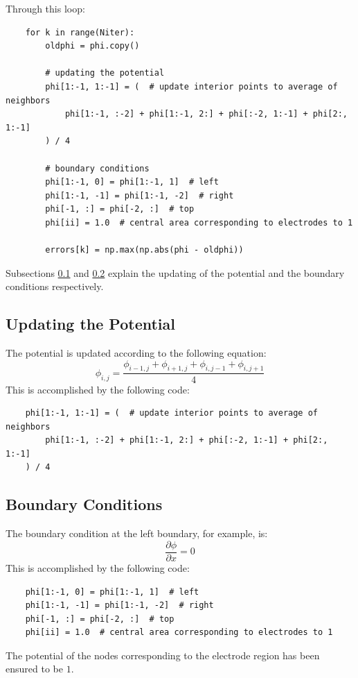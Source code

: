 \documentclass[12pt, a4paper]{article}
\begin{document}
Through this loop:
\begin{lstlisting}
    for k in range(Niter):
        oldphi = phi.copy()

        # updating the potential
        phi[1:-1, 1:-1] = (  # update interior points to average of neighbors
            phi[1:-1, :-2] + phi[1:-1, 2:] + phi[:-2, 1:-1] + phi[2:, 1:-1]
        ) / 4

        # boundary conditions
        phi[1:-1, 0] = phi[1:-1, 1]  # left
        phi[1:-1, -1] = phi[1:-1, -2]  # right
        phi[-1, :] = phi[-2, :]  # top
        phi[ii] = 1.0  # central area corresponding to electrodes to 1

        errors[k] = np.max(np.abs(phi - oldphi))
\end{lstlisting}
Subsections \ref{sec:updating} and \ref{sec:boundaries} explain the updating of the potential
and the boundary conditions respectively.


\subsection{Updating the Potential} \label{sec:updating}
The potential is updated according to the following equation:
\begin{equation*}
    \phi_{i,j} = \frac{\phi_{i-1,j} + \phi_{i+1,j} + \phi_{i,j-1} + \phi_{i,j+1}}{4}
\end{equation*}
This is accomplished by the following code:
\begin{lstlisting}
    phi[1:-1, 1:-1] = (  # update interior points to average of neighbors
        phi[1:-1, :-2] + phi[1:-1, 2:] + phi[:-2, 1:-1] + phi[2:, 1:-1]
    ) / 4
\end{lstlisting}


\subsection{Boundary Conditions} \label{sec:boundaries}
The boundary condition at the left boundary, for example, is:
\begin{equation*}
    \frac{\partial \phi}{\partial x} = 0
\end{equation*}
This is accomplished by the following code:
\begin{lstlisting}
    phi[1:-1, 0] = phi[1:-1, 1]  # left
    phi[1:-1, -1] = phi[1:-1, -2]  # right
    phi[-1, :] = phi[-2, :]  # top
    phi[ii] = 1.0  # central area corresponding to electrodes to 1
\end{lstlisting}
The potential of the nodes corresponding to the electrode region has been ensured to be $1$.
\pagebreak
\end{document}
